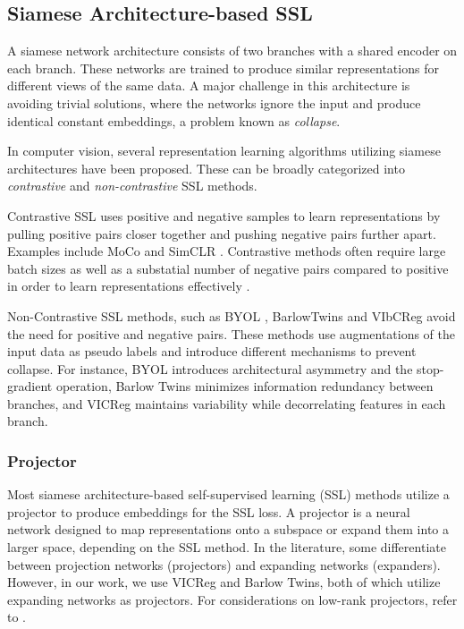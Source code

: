 \documentclass[../../thesis.tex]{subfiles}
\begin{document}
\subsection{Siamese Architecture-based SSL }
A siamese network architecture \cite{siamese} consists of two branches with a shared encoder on each branch. These networks are trained to produce similar representations for different views of the same data. A major challenge in this architecture is avoiding trivial solutions, where the networks ignore the input and produce identical constant embeddings, a problem known as \textit{collapse}.\newline
{}

In computer vision, several representation learning algorithms utilizing siamese architectures have been proposed. These can be broadly categorized into \textit{contrastive} and \textit{non-contrastive} SSL methods.\newline

Contrastive SSL uses positive and negative samples to learn representations by pulling positive pairs closer together and pushing negative pairs further apart. Examples include MoCo \cite{he2020momentum} and SimCLR \cite{chen2020simple}. Contrastive methods often require large batch sizes as well as a substatial number of negative pairs compared to positive in order to learn representations effectively \cite{lee2024computer}.\newline

Non-Contrastive SSL methods, such as BYOL \cite{grill2020bootstrap}, BarlowTwins \cite{zbontar2021barlow} and VIbCReg \cite{lee2024computer} avoid the need for positive and negative pairs. These methods use augmentations of the input data as pseudo labels and introduce different mechanisms to prevent collapse. For instance, BYOL introduces architectural asymmetry and the stop-gradient operation, Barlow Twins minimizes information redundancy between branches, and VICReg maintains variability while decorrelating features in each branch.

\subsubsection{Projector}

Most siamese architecture-based self-supervised learning (SSL) methods utilize a projector to produce embeddings for the SSL loss. A projector is a neural network designed to map representations onto a subspace or expand them into a larger space, depending on the SSL method. In the literature, some differentiate between projection networks (projectors) and expanding networks (expanders). However, in our work, we use VICReg and Barlow Twins, both of which utilize expanding networks as projectors. For considerations on low-rank projectors, refer to \cite{gupta2022understanding}.\newline
\end{document}
